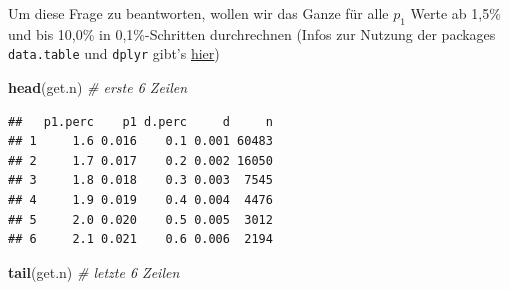 \documentclass[
]{article}
\newenvironment{Shaded}{\begin{snugshade}}{\end{snugshade}}
\newcommand{\CommentTok}[1]{\textcolor[rgb]{0.56,0.35,0.01}{\textit{#1}}}
\newcommand{\DataTypeTok}[1]{\textcolor[rgb]{0.13,0.29,0.53}{#1}}
\newcommand{\DecValTok}[1]{\textcolor[rgb]{0.00,0.00,0.81}{#1}}
\newcommand{\FloatTok}[1]{\textcolor[rgb]{0.00,0.00,0.81}{#1}}
\newcommand{\KeywordTok}[1]{\textcolor[rgb]{0.13,0.29,0.53}{\textbf{#1}}}
\newcommand{\NormalTok}[1]{#1}
\newcommand{\OperatorTok}[1]{\textcolor[rgb]{0.81,0.36,0.00}{\textbf{#1}}}
\newcommand{\StringTok}[1]{\textcolor[rgb]{0.31,0.60,0.02}{#1}}
\begin{document}
Um diese Frage zu beantworten, wollen wir das Ganze für alle \(p_1\)
Werte ab 1,5\% und bis 10,0\% in 0,1\%-Schritten durchrechnen (Infos zur
Nutzung der packages \texttt{data.table} und \texttt{dplyr} gibt's
\href{DatR_MoreAdvanced.html}{hier})

\begin{Shaded}
\end{Shaded}

\begin{Shaded}
\begin{Highlighting}[]
\KeywordTok{head}\NormalTok{(get.n) }\CommentTok{# erste 6 Zeilen}
\end{Highlighting}
\end{Shaded}

\begin{verbatim}
##   p1.perc    p1 d.perc     d     n
## 1     1.6 0.016    0.1 0.001 60483
## 2     1.7 0.017    0.2 0.002 16050
## 3     1.8 0.018    0.3 0.003  7545
## 4     1.9 0.019    0.4 0.004  4476
## 5     2.0 0.020    0.5 0.005  3012
## 6     2.1 0.021    0.6 0.006  2194
\end{verbatim}

\begin{Shaded}
\begin{Highlighting}[]
\KeywordTok{tail}\NormalTok{(get.n) }\CommentTok{# letzte 6 Zeilen}
\end{Highlighting}
\end{Shaded}
\end{document}
